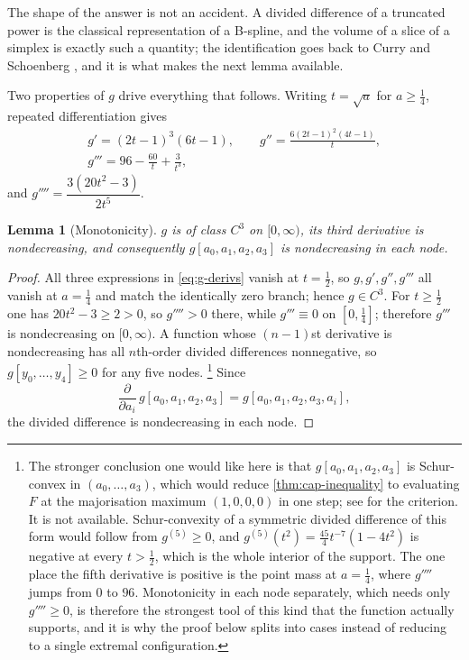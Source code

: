 \documentclass[11pt,reqno]{amsart}
\renewcommand{\_}{\origunderscore\allowbreak}
\numberwithin{equation}{section}
\theoremstyle{plain}
\newtheorem{lem}[thm]{Lemma}
\theoremstyle{definition}
\theoremstyle{remark}
\begin{document}
The shape of the answer is not an accident. A divided difference of a
truncated power is the classical representation of a B-spline, and the
volume of a slice of a simplex is exactly such a quantity; the
identification goes back to Curry and Schoenberg \cite{CSc66}, and it is
what makes the next lemma available.

Two properties of $g$ drive everything that follows. Writing $t=\sqrt a$
for $a\ge\tfrac14$, repeated differentiation gives
\begin{equation}\label{eq:g-derivs}
  \begin{gathered}
  g'=(2t-1)^3(6t-1),\qquad
  g''=\frac{6(2t-1)^2(4t-1)}{t},\\
  g'''=96-\frac{60}{t}+\frac{3}{t^3},
  \end{gathered}
\end{equation}
and $g''''=\dfrac{3(20t^2-3)}{2t^5}$.

\begin{lem}[Monotonicity]\label{lem:monotone}
$g$ is of class $C^3$ on $[0,\infty)$, its third derivative is
nondecreasing, and consequently $g[a_0,a_1,a_2,a_3]$ is nondecreasing in
each node.
\end{lem}

\begin{proof}
All three expressions in \cref{eq:g-derivs} vanish at $t=\tfrac12$, so
$g,g',g'',g'''$ all vanish at $a=\tfrac14$ and match the identically zero
branch; hence $g\in C^3$. For $t\ge\tfrac12$ one has $20t^2-3\ge2>0$, so
$g''''>0$ there, while $g'''\equiv0$ on $[0,\tfrac14]$; therefore $g'''$ is
nondecreasing on $[0,\infty)$. A function whose $(n-1)$st derivative is
nondecreasing has all $n$th-order divided differences nonnegative, so
$g[y_0,\dots,y_4]\ge0$ for any five nodes.%
\footnote{The stronger conclusion one would like here is that
  $g[a_0,a_1,a_2,a_3]$ is Schur-convex in $(a_0,\dots,a_3)$, which would
  reduce \cref{thm:cap-inequality} to evaluating $F$ at the majorisation
  maximum $(1,0,0,0)$ in one step; see \cite[Ch.~3]{MOA11} for the
  criterion. It is not available. Schur-convexity of a symmetric
  divided difference of this form would follow from $g^{(5)}\ge0$, and
  $g^{(5)}(t^2)=\tfrac{45}{4}t^{-7}(1-4t^2)$ is negative at every
  $t>\tfrac12$, which is the whole interior of the support. The one
  place the fifth derivative is positive is the point mass at
  $a=\tfrac14$, where $g''''$ jumps from $0$ to $96$. Monotonicity in each node separately, which needs only
  $g''''\ge0$, is therefore the strongest tool of this kind that the
  function actually supports, and it is why the proof below splits into cases instead of reducing to a single extremal configuration.} Since
\[
  \frac{\partial}{\partial a_i}\,g[a_0,a_1,a_2,a_3]
  =g[a_0,a_1,a_2,a_3,a_i],
\]
the divided difference is nondecreasing in each node.
\end{proof}
\end{document}
